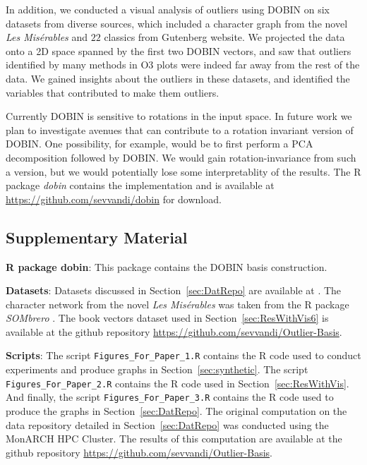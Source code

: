 \documentclass[letter,12pt]{article}
\begin{document}
In addition, we conducted a visual analysis of outliers using DOBIN on six datasets from diverse sources, which included a character graph from the novel \textit{Les Mis\'erables} and $22$ classics from Gutenberg website. We projected the data onto a 2D space spanned by the first two DOBIN vectors, and saw that outliers identified by many methods in O3 plots were indeed far away from the rest of the data. We gained insights about the outliers in these datasets, and identified the variables that contributed to make them outliers.


Currently DOBIN is sensitive to rotations in the input space. In future work we plan to investigate avenues that can contribute to a rotation invariant version of DOBIN. One possibility, for example, would be to first perform a PCA decomposition followed by DOBIN. We would gain rotation-invariance from such a version, but we would potentially lose some interpretablity of the results. The R package \textit{dobin} contains the implementation and is available at \url{https://github.com/sevvandi/dobin} for download.

\subsection*{Supplementary Material}

\textbf{R package dobin}: This package contains the DOBIN basis construction.

\textbf{Datasets}: Datasets discussed in Section~\ref{sec:DatRepo} are available at \cite{datasets}. The character network from the novel \textit{Les Mis\'erables} was taken from the R package \textit{SOMbrero} \citep{sombrero}. The book vectors dataset used in Section~\ref{sec:ResWithVis6} is available at the github repository \url{https://github.com/sevvandi/Outlier-Basis}.

\textbf{Scripts}: The script \texttt{Figures\_For\_Paper\_1.R} contains the R code used to conduct experiments and produce graphs in Section~\ref{sec:synthetic}. The script \texttt{Figures\_For\_Paper\_2.R} contains the R code used in Section~\ref{sec:ResWithVis}. And finally, the script \texttt{Figures\_For\_Paper\_3.R} contains the R code used to produce the graphs in Section~\ref{sec:DatRepo}. The original computation on the data repository detailed in Section~\ref{sec:DatRepo} was conducted using the MonARCH HPC Cluster. The results of this computation are available at the github repository \url{https://github.com/sevvandi/Outlier-Basis}.
\end{document}
